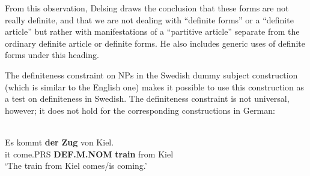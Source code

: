 From this observation, Delsing draws the conclusion that these forms are not really definite, and that we are not dealing with “definite forms” or a “definite article” but rather with manifestations of a “partitive article” separate from the ordinary definite article or definite forms. He also includes generic uses of definite forms under this heading. 


The definiteness constraint on NPs in the Swedish dummy subject construction (which is similar to the English one) makes it possible to use this construction as a test on definiteness in Swedish. The definiteness constraint is not universal, however; it does not hold for the corresponding constructions in German:


\ea \label{} 
\\
\gll Es  kommt  \textbf{der} \textbf{  Zug} von  Kiel.\\
it  come.PRS  \textbf{DEF.M.NOM} \textbf{train} from  Kiel\\
\glt ‘The train from Kiel comes/is coming.’

\z

